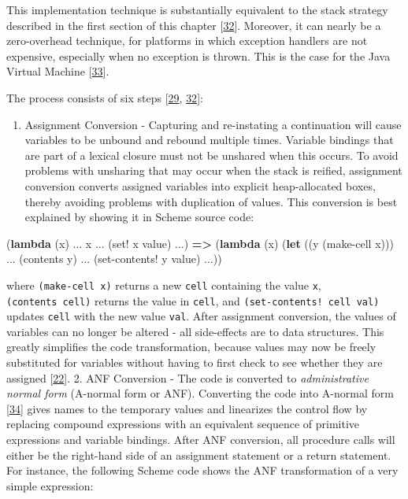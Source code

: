 \documentclass[12pt,a4paper,oneside,openright]{book}
\newenvironment{Shaded}{\begin{snugshade}}{\end{snugshade}}
\newcommand{\KeywordTok}[1]{\textcolor[rgb]{0.13,0.29,0.53}{\textbf{{#1}}}}
\newcommand{\NormalTok}[1]{{#1}}
\providecommand{\tightlist}{%
  \setlength{\itemsep}{0pt}\setlength{\parskip}{0pt}}
\begin{document}
This implementation technique is substantially equivalent to the stack
strategy described in the first section of this chapter
{[}\hyperref[ref-StackHack2005]{32}{]}. Moreover, it can nearly be a
zero-overhead technique, for platforms in which exception handlers are
not expensive, especially when no exception is thrown. This is the case
for the Java Virtual Machine {[}\hyperref[ref-Longjumps2015]{33}{]}.

The process consists of six steps {[}\hyperref[ref-Marshall2009]{29},
\hyperref[ref-StackHack2005]{32}{]}:

\begin{enumerate}
\def\labelenumi{\arabic{enumi}.}
\tightlist
\item
  Assignment Conversion - Capturing and re-instating a continuation will
  cause variables to be unbound and rebound multiple times. Variable
  bindings that are part of a lexical closure must not be unshared when
  this occurs. To avoid problems with unsharing that may occur when the
  stack is reified, assignment conversion converts assigned variables
  into explicit heap-allocated boxes, thereby avoiding problems with
  duplication of values. This conversion is best explained by showing it
  in Scheme source code:
\end{enumerate}

\begin{Shaded}
\begin{Highlighting}[]
    \NormalTok{(}\KeywordTok{lambda} \NormalTok{(x) ... x ... (set! x value) ...)}
        \KeywordTok{=>}
    \NormalTok{(}\KeywordTok{lambda} \NormalTok{(x)}
        \NormalTok{(}\KeywordTok{let} \NormalTok{((y (make-cell x)))}
            \NormalTok{... (contents y) ... (set-contents! y value) ...))}
\end{Highlighting}
\end{Shaded}

where \texttt{(make-cell\ x)} returns a new \texttt{cell} containing the
value \texttt{x}, \texttt{(contents\ cell)} returns the value in
\texttt{cell}, and \texttt{(set-contents!\ cell\ val)} updates
\texttt{cell} with the new value \texttt{val}. After assignment
conversion, the values of variables can no longer be altered - all
side-effects are to data structures. This greatly simplifies the code
transformation, because values may now be freely substituted for
variables without having to first check to see whether they are assigned
{[}\hyperref[ref-adams1986orbit]{22}{]}. 2. ANF Conversion - The code is
converted to \emph{administrative normal form} (A-normal form or ANF).
Converting the code into A-normal form
{[}\hyperref[ref-Flanagan1993]{34}{]} gives names to the temporary
values and linearizes the control flow by replacing compound expressions
with an equivalent sequence of primitive expressions and variable
bindings. After ANF conversion, all procedure calls will either be the
right-hand side of an assignment statement or a return statement. For
instance, the following Scheme code shows the ANF transformation of a
very simple expression:
\end{document}
